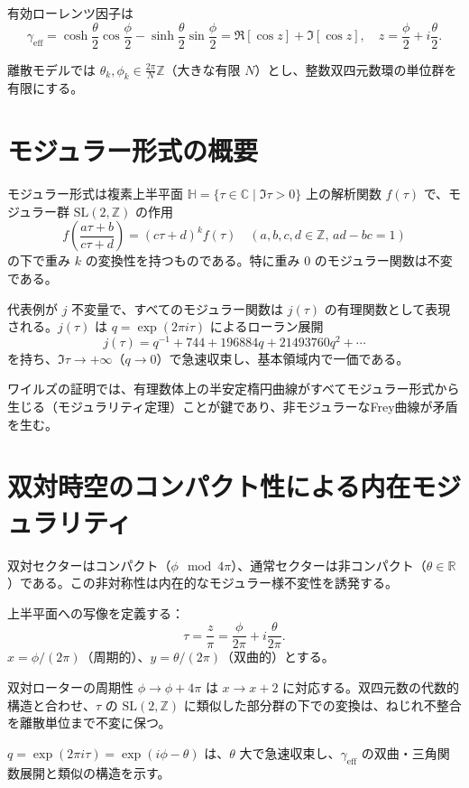 \documentclass[a4paper]{article}
\begin{document}
有効ローレンツ因子は
\[
\gamma_\text{eff} = \cosh\!\frac{\theta}{2} \cos\!\frac{\phi}{2} - \sinh\!\frac{\theta}{2} \sin\!\frac{\phi}{2}
= \Re[\cos z] + \Im[\cos z], \quad z = \frac{\phi}{2} + i \frac{\theta}{2}.
\]

離散モデルでは $\theta_k, \phi_k \in \frac{2\pi}{N} \mathbb{Z}$（大きな有限 $N$）とし、整数双四元数環の単位群を有限にする。

\section{モジュラー形式の概要}

モジュラー形式は複素上半平面 $\mathbb{H} = \{\tau \in \mathbb{C} \mid \Im \tau > 0\}$ 上の解析関数 $f(\tau)$ で、モジュラー群 $\mathrm{SL}(2,\mathbb{Z})$ の作用
\[
f\left( \frac{a\tau + b}{c\tau + d} \right) = (c\tau + d)^{k} f(\tau) \quad (a,b,c,d \in \mathbb{Z}, \, ad-bc=1)
\]
の下で重み $k$ の変換性を持つものである。特に重み $0$ のモジュラー関数は不変である。

代表例が $j$ 不変量で、すべてのモジュラー関数は $j(\tau)$ の有理関数として表現される。$j(\tau)$ は $q = \exp(2\pi i \tau)$ によるローラン展開
\[
j(\tau) = q^{-1} + 744 + 196884 q + 21493760 q^2 + \cdots
\]
を持ち、$\Im \tau \to +\infty$（$q \to 0$）で急速収束し、基本領域内で一価である。

ワイルズの証明では、有理数体上の半安定楕円曲線がすべてモジュラー形式から生じる（モジュラリティ定理）ことが鍵であり、非モジュラーなFrey曲線が矛盾を生む。

\section{双対時空のコンパクト性による内在モジュラリティ}

双対セクターはコンパクト（$\phi \mod 4\pi$）、通常セクターは非コンパクト（$\theta \in \mathbb{R}$）である。この非対称性は内在的なモジュラー様不変性を誘発する。

上半平面への写像を定義する：
\[
\tau = \frac{z}{\pi} = \frac{\phi}{2\pi} + i \frac{\theta}{2\pi}.
\]
$x = \phi/(2\pi)$（周期的）、$y = \theta/(2\pi)$（双曲的）とする。

双対ローターの周期性 $\phi \to \phi + 4\pi$ は $x \to x + 2$ に対応する。双四元数の代数的構造と合わせ、$\tau$ の $\mathrm{SL}(2,\mathbb{Z})$ に類似した部分群の下での変換は、ねじれ不整合を離散単位まで不変に保つ。

$q = \exp(2\pi i \tau) = \exp(i \phi - \theta)$ は、$\theta$ 大で急速収束し、$\gamma_\text{eff}$ の双曲・三角関数展開と類似の構造を示す。
\end{document}
